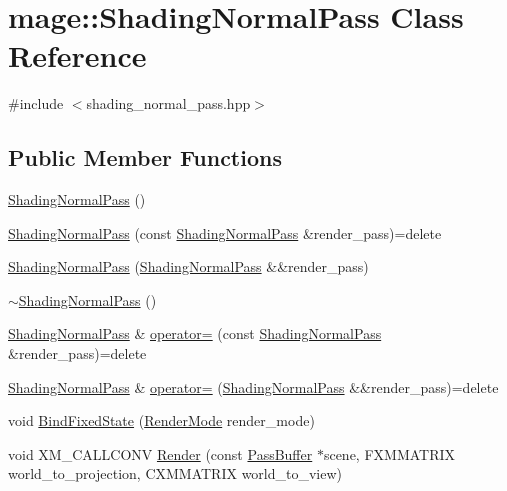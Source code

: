 \hypertarget{classmage_1_1_shading_normal_pass}{}\section{mage\+:\+:Shading\+Normal\+Pass Class Reference}
\label{classmage_1_1_shading_normal_pass}


{\ttfamily \#include $<$shading\+\_\+normal\+\_\+pass.\+hpp$>$}

\subsection*{Public Member Functions}
\begin{DoxyCompactItemize}
\item 
\hyperlink{classmage_1_1_shading_normal_pass_a8d85834472875ce27cf3966b7c561d1f}{Shading\+Normal\+Pass} ()
\item 
\hyperlink{classmage_1_1_shading_normal_pass_ab13b45f9a3118f8494150d64ff06f94f}{Shading\+Normal\+Pass} (const \hyperlink{classmage_1_1_shading_normal_pass}{Shading\+Normal\+Pass} \&render\+\_\+pass)=delete
\item 
\hyperlink{classmage_1_1_shading_normal_pass_acc466f246daaf57ccace5aa8782f0799}{Shading\+Normal\+Pass} (\hyperlink{classmage_1_1_shading_normal_pass}{Shading\+Normal\+Pass} \&\&render\+\_\+pass)
\item 
\hyperlink{classmage_1_1_shading_normal_pass_aba7194077210d32dbcbc6cfbf4adba8f}{$\sim$\+Shading\+Normal\+Pass} ()
\item 
\hyperlink{classmage_1_1_shading_normal_pass}{Shading\+Normal\+Pass} \& \hyperlink{classmage_1_1_shading_normal_pass_afef400a6e3b00a43f6b6d3a3f34d43b7}{operator=} (const \hyperlink{classmage_1_1_shading_normal_pass}{Shading\+Normal\+Pass} \&render\+\_\+pass)=delete
\item 
\hyperlink{classmage_1_1_shading_normal_pass}{Shading\+Normal\+Pass} \& \hyperlink{classmage_1_1_shading_normal_pass_a25a9ba6a32a246176929f4de1a4adf0c}{operator=} (\hyperlink{classmage_1_1_shading_normal_pass}{Shading\+Normal\+Pass} \&\&render\+\_\+pass)=delete
\item 
void \hyperlink{classmage_1_1_shading_normal_pass_a49c57b6c8a6aee0678556f25f9c97d11}{Bind\+Fixed\+State} (\hyperlink{namespacemage_a5e7e18b0154373ce8fc942fe3f6b27fd}{Render\+Mode} render\+\_\+mode)
\item 
void X\+M\+\_\+\+C\+A\+L\+L\+C\+O\+NV \hyperlink{classmage_1_1_shading_normal_pass_ad9fbc17ade1de5150d5b184aa780fb01}{Render} (const \hyperlink{structmage_1_1_pass_buffer}{Pass\+Buffer} $\ast$scene, F\+X\+M\+M\+A\+T\+R\+IX world\+\_\+to\+\_\+projection, C\+X\+M\+M\+A\+T\+R\+IX world\+\_\+to\+\_\+view)
\end{DoxyCompactItemize}
